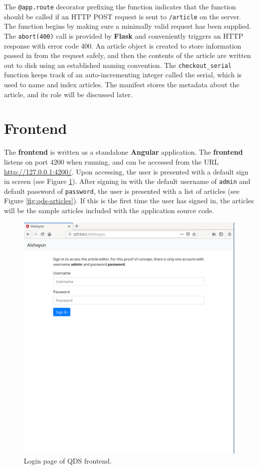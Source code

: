 \documentclass[12pt]{report}
\begin{document}
The \texttt{@app.route} decorator prefixing the function indicates that the
function should be called if an HTTP POST request is sent to \texttt{/article}
on the server. The function begins by making sure a minimally valid request has
been supplied. The \texttt{abort(400)} call is provided by \textbf{Flask} and
conveniently triggers an HTTP response with error code 400. An article object is
created to store information passed in from the request safely, and then the
contents of the article are written out to disk using an established naming
convention. The \texttt{checkout\_serial} function keeps track of an
auto-incrementing integer called the serial, which is used to name and index
articles. The manifest stores the metadata about the article, and its role will
be discussed later.

    \section{Frontend}

The \textbf{frontend} is written as a standalone \textbf{Angular} application.
The \textbf{frontend} listens on port 4200 when running, and can be accessed
from the URL \url{http://127.0.0.1:4200/}. Upon accessing, the user is presented
with a default sign in screen (see Figure \ref{fig:qds-login}). After signing in
with the default username of \texttt{admin} and default password of
\texttt{password}, the user is presented with a list of articles (see Figure
\ref{fig:qds-articles}). If this is the first time the user has signed in, the
articles will be the sample articles included with the application source code.

\begin{figure}
    \centering
    \includegraphics[scale=0.4]{images/qds-login.png}
    \caption{Login page of QDS frontend.}
    \label{fig:qds-login}
\end{figure}
\end{document}

